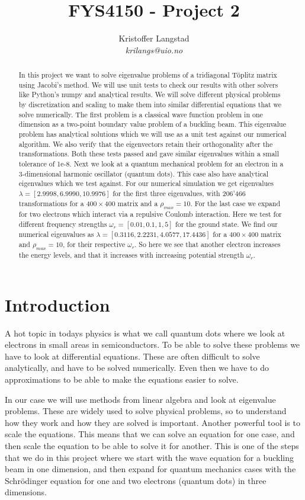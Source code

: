 \documentclass[12pt,a4paper,english]{article}
\title{FYS4150 - Project 2}
\date{}
\author{ Kristoffer Langstad\\ \textit{krilangs@uio.no}}
\begin{document}
\maketitle
\begin{abstract}
In this project we want to solve eigenvalue problems of a tridiagonal Töplitz matrix using Jacobi's method. We will use unit tests to check our results with other solvers like Python's numpy and analytical results. We will solve different physical problems by discretization and scaling to make them into similar differential equations that we solve numerically. The first problem is a classical wave function problem in one dimension as a two-point boundary value problem of a buckling beam. This eigenvalue problem has analytical solutions which we will use as a unit test against our numerical algorithm. We also verify that the eigenvectors retain their orthogonality after the transformations. Both these tests passed and gave similar eigenvalues within a small tolerance of 1e-8. Next we look at a quantum mechanical problem for an electron in a 3-dimensional harmonic oscillator (quantum dots). This case also have analytical eigenvalues which we test against. For our numerical simulation we get eigenvalues $\lambda=[2.9998, 6.9990, 10.9976]$ for the first three eigenvalues, with 206'466 transformations for a $400\times400$ matrix and a $\rho_{max}=10$. For the last case we expand for two electrons which interact via a repulsive Coulomb interaction. Here we test for different frequency strengths $\omega_r=[0.01, 0.1, 1, 5]$ for the ground state. We find our numerical eigenvalues as $\lambda=[0.3116,2.2231, 4.0577,17.4436]$ for a $400\times400$ matrix and $\rho_{max}=10$, for their respective $\omega_r$. So here we see that another electron increases the energy levels, and that it increases with increasing potential strength $\omega_r$.
\end{abstract}

\section{Introduction}
A hot topic in todays physics is what we call quantum dots where we look at electrons in small areas in semiconductors. To be able to solve these problems we have to look at differential equations. These are often difficult to solve analytically, and have to be solved numerically. Even then we have to do approximations to be able to make the equations easier to solve.

In our case we will use methods from linear algebra and look at eigenvalue problems. These are widely used to solve physical problems, so to understand how they work and how they are solved is important. Another powerful tool is to scale the equations. This means that we can solve an equation for one case, and then scale the equation to be able to solve it for another. This is one of the steps that we do in this project where we start with the wave equation for a buckling beam in one dimension, and then expand for quantum mechanics cases with the Schrödinger equation for one and two electrons (quantum dots) in three dimensions.
\end{document}
